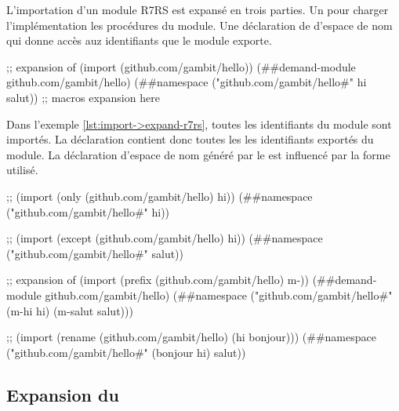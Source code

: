 L'importation d'un module R7RS est expansé en trois parties.
Un  pour charger l'implémentation les procédures du
module. Une déclaration de d'espace de nom qui donne accès auz identifiants
que le module exporte.

\begin{center}
  \begin{mplisting}{1}
;; expansion of (import (github.com/gambit/hello))
(##demand-module github.com/gambit/hello)
(##namespace ("github.com/gambit/hello#" hi salut))
;; macros expansion here
\end{mplisting}
\end{center}

Dans l'exemple \ref{lst:import->expand-r7rs}, toutes les identifiants du module
sont importés. La déclaration  contient donc toutes les
les identifiants exportés du module. La déclaration d'espace de nom généré par
le  est influencé par la forme utilisé. \\


\begin{center}
  \begin{mplisting}{1}
;; (import (only (github.com/gambit/hello) hi))
(##namespace ("github.com/gambit/hello#" hi))

;; (import (except (github.com/gambit/hello) hi))
(##namespace ("github.com/gambit/hello#" salut))

;; expansion of (import (prefix (github.com/gambit/hello) m-))
(##demand-module github.com/gambit/hello)
(##namespace ("github.com/gambit/hello#" (m-hi hi) (m-salut salut)))

;; (import (rename (github.com/gambit/hello) (hi bonjour)))
(##namespace ("github.com/gambit/hello#" (bonjour hi) salut))
\end{mplisting}
\end{center}


\subsection{Expansion du }


